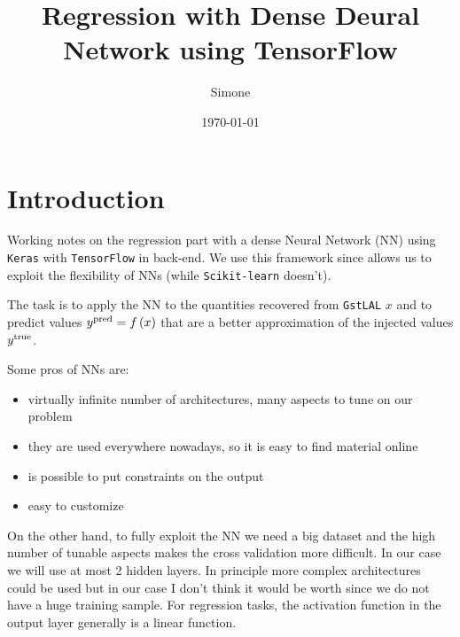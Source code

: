 \documentclass[prd,aps,twocolumn,a4paper,showkeys,nofootinbib]{revtex4-1}
\begin{document}
\title{Regression with Dense Deural Network using TensorFlow}

\author{Simone }

\date{\today}

\maketitle

\section{Introduction}
Working notes on the regression part with a dense Neural Network (NN)
using \texttt{Keras} with \texttt{TensorFlow} in back-end. We use this framework since allows us to
exploit the flexibility of NNs (while \texttt{Scikit-learn} doesn't).

The task is to apply the NN to the quantities recovered from \texttt{GstLAL} $x$ and to predict
values $y^{\rm pred} = f\left( x \right)$ that are a better approximation of the injected 
values $y^{\rm true}$.

Some pros of NNs are:
\begin{itemize}
\item virtually infinite number of architectures, many aspects to tune on our problem 
\item they are used everywhere nowadays, so it is easy to find material online
\item is possible to put constraints on the output
\item easy to customize
\end{itemize}
On the other hand, to fully exploit the NN we need a big dataset and the high number of tunable
aspects makes the cross validation more difficult. In our case we will use at most 2 hidden layers.
In principle more complex architectures could  be used but in our case 
I don't think it would be worth since we do not have a huge training sample. 
For regression tasks, the activation function in the output layer generally is a linear function.
\end{document}
